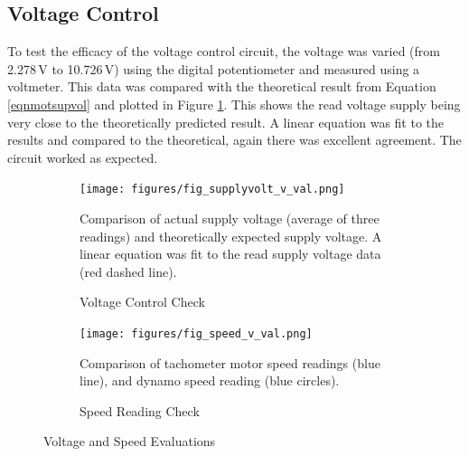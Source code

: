 \documentclass[twoside,a4]{report}
\begin{document}
	\subsection*{Voltage Control}
	To test the efficacy of the voltage control circuit, the voltage was varied (from 2.278\,V to 10.726\,V) using the digital potentiometer and measured using a voltmeter. This data was compared with the theoretical result from Equation \ref{eqnmotsupvol} and plotted in Figure \ref{figvoltvval}. This shows the read voltage supply being very close to the theoretically predicted result. A linear equation was fit to the results and compared to the theoretical, again there was excellent agreement. The circuit worked as expected.
	\begin{figure}[!htb]
		\centering
		\begin{subfigure}[t]{0.45\textwidth}
			\centering
			\texttt{[image: figures/fig\_supplyvolt\_v\_val.png]}
			\caption{Voltage Control Check}
			\label{figvoltvval}
			\footnotesize
			Comparison of actual supply voltage (average of three readings) and theoretically expected supply voltage. A linear equation was fit to the read supply voltage data (red dashed line).
		\end{subfigure}
		\begin{subfigure}[t]{0.45\textwidth}
			\centering
			\texttt{[image: figures/fig\_speed\_v\_val.png]}
			\caption{Speed Reading Check}
			\label{figdynocheck}
			\footnotesize
			Comparison of tachometer motor speed readings (blue line), and dynamo speed reading (blue circles).
		\end{subfigure}
		\label{figspeecal}
		\caption{Voltage and Speed Evaluations}
	\end{figure}
	
\end{document}
